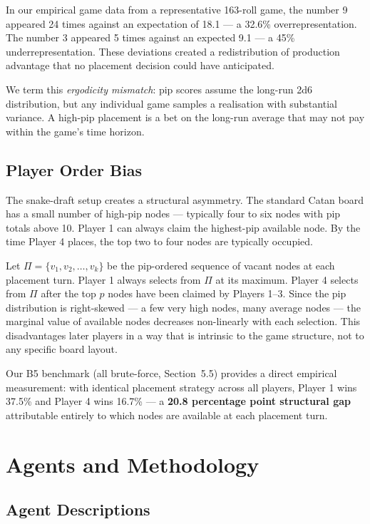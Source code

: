\documentclass[12pt,a4paper]{article}
\begin{document}
{In our empirical game data from a representative 163-roll game, the
number 9 appeared 24 times against an expectation of 18.1 --- a 32.6\%
overrepresentation. The number 3 appeared 5 times against an expected
9.1 --- a 45\% underrepresentation. These deviations created a
redistribution of production advantage that no placement decision could
have anticipated.

We term this \textit{ergodicity mismatch}: pip scores assume the long-run
2d6 distribution, but any individual game samples a realisation with
substantial variance. A high-pip placement is a bet on the long-run
average that may not pay within the game's time horizon.

\subsection{Player Order Bias}

The snake-draft setup creates a structural asymmetry. The standard Catan
board has a small number of high-pip nodes --- typically four to six
nodes with pip totals above 10. Player 1 can always claim the highest-pip
available node. By the time Player 4 places, the top two to four nodes
are typically occupied.

Let $\Pi = \{v_1, v_2, \ldots, v_k\}$ be the pip-ordered sequence of
vacant nodes at each placement turn. Player 1 always selects from $\Pi$
at its maximum. Player 4 selects from $\Pi$ after the top $p$ nodes have
been claimed by Players 1--3. Since the pip distribution is right-skewed
--- a few very high nodes, many average nodes --- the marginal value of
available nodes decreases non-linearly with each selection. This
disadvantages later players in a way that is intrinsic to the game
structure, not to any specific board layout.

Our B5 benchmark (all brute-force, Section~5.5) provides a direct
empirical measurement: with identical placement strategy across all
players, Player 1 wins 37.5\% and Player 4 wins 16.7\% --- a
\textbf{20.8 percentage point structural gap} attributable entirely to
which nodes are available at each placement turn.

\section{Agents and Methodology}

\subsection{Agent Descriptions}

}
\end{document}
